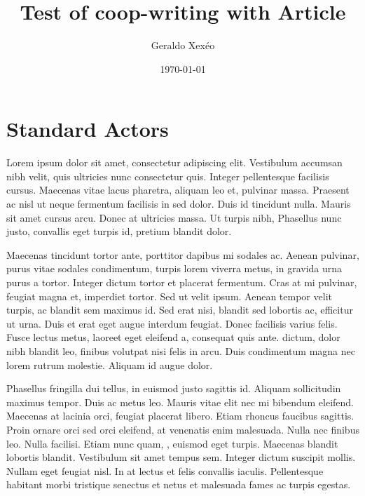 \documentclass[12pt,a4paper]{article}
\author{Geraldo Xexéo}
\date{\today}
\title{Test of coop-writing with Article}
\begin{document}
\maketitle

\section{Standard Actors}


Lorem ipsum dolor sit amet, consectetur adipiscing elit. Vestibulum accumsan nibh velit, quis ultricies nunc consectetur quis. Integer pellentesque facilisis cursus. Maecenas vitae lacus pharetra, aliquam leo et, pulvinar massa. Praesent ac nisl ut neque fermentum facilisis in sed dolor. Duis id tincidunt nulla. Mauris sit amet cursus arcu. Donec at ultricies massa. Ut turpis nibh,  Phasellus nunc justo, convallis eget turpis id, pretium blandit dolor.

Maecenas tincidunt tortor ante, porttitor dapibus mi sodales ac. Aenean pulvinar, purus vitae sodales condimentum, turpis lorem viverra metus, in gravida urna purus a tortor. Integer dictum tortor et placerat fermentum. Cras at mi pulvinar, feugiat magna et, imperdiet tortor. Sed ut velit ipsum. Aenean tempor velit turpis, ac blandit sem maximus id. Sed erat nisi, blandit sed lobortis ac, efficitur ut urna. Duis et erat eget augue interdum feugiat. Donec facilisis varius felis. Fusce lectus metus, laoreet eget eleifend a, consequat quis ante.  dictum, dolor nibh blandit leo, finibus volutpat nisi felis in arcu. Duis condimentum magna nec lorem rutrum molestie. Aliquam id augue dolor.

Phasellus fringilla dui tellus, in euismod justo sagittis id. Aliquam sollicitudin maximus tempor. Duis ac metus leo. Mauris vitae elit nec mi bibendum eleifend. Maecenas at lacinia orci, feugiat placerat libero. Etiam rhoncus faucibus sagittis. Proin ornare orci sed orci eleifend, at venenatis enim malesuada. Nulla nec finibus leo. Nulla facilisi. Etiam nunc quam, , euismod eget turpis. Maecenas blandit lobortis blandit. Vestibulum sit amet tempus sem. Integer dictum suscipit mollis. Nullam eget feugiat nisl. In at lectus et felis convallis iaculis. Pellentesque habitant morbi tristique senectus et netus et malesuada fames ac turpis egestas.
\end{document}
